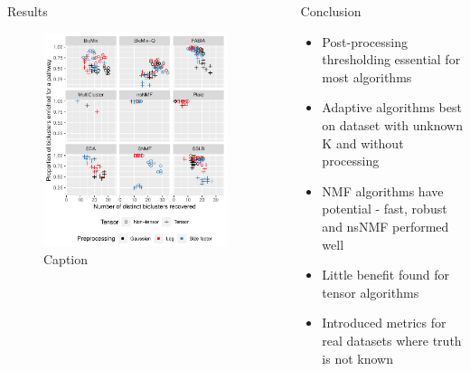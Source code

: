 \documentclass[final]{beamer}
\newlength{\sepwid}
\newlength{\onecolwid}
\begin{document}
\begin{frame}[t]
\begin{columns}[t]
\begin{column}{\onecolwid}
\begin{block}{Results}
\begin{figure}
\includegraphics[width=0.9 \textwidth]{plots/pathway_enrichment_num_unique_best_pathways.pdf}
\caption{Caption}
\end{figure}
\end{block}


\end{column} %

\begin{column}{\sepwid}\end{column} %
\begin{column}{\onecolwid} %


\begin{block}{Conclusion}

\begin{itemize}
    \item Post-processing thresholding essential for most algorithms
    \item Adaptive algorithms best on dataset with unknown K and without processing
    \item NMF algorithms have potential - fast, robust and nsNMF performed well
    \item Little benefit found for tensor algorithms
    \item Introduced metrics for real datasets where truth is not known
\end{itemize}


\end{block}
\end{column}
\end{columns}
\end{frame}
\end{document}
